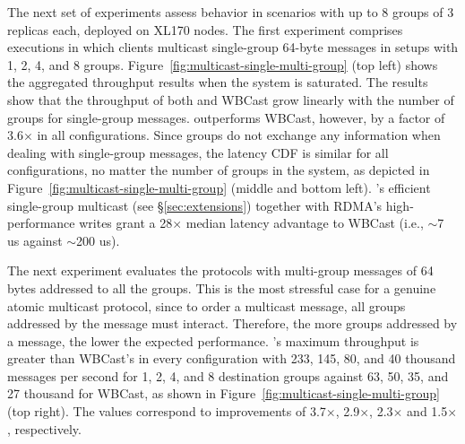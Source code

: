 The next set of experiments assess \libname behavior in scenarios with up to 8 groups of 3 replicas each, deployed on XL170 nodes.
The first experiment comprises executions in which clients multicast single-group 64-byte messages in setups with 1, 2, 4, and 8 groups.
Figure~\ref{fig:multicast-single-multi-group} (top left) shows the aggregated throughput results when the system is saturated. 
The results show that the throughput of both \libname and WBCast grow linearly with the number of groups for single-group messages. 
\libname outperforms WBCast, however, by a factor of 3.6$\times$ in all configurations.
Since groups do not exchange any information when dealing with single-group messages, the latency CDF is similar for all configurations, no matter the number of groups in the system, as depicted in Figure~\ref{fig:multicast-single-multi-group} (middle and bottom left).
\libname's efficient single-group multicast (see \S\ref{sec:extensions}) together with RDMA's high-performance writes grant \libname a 28$\times$ median latency advantage to WBCast (i.e., $\sim$7 us against $\sim$200 us).


The next experiment evaluates the protocols with multi-group messages of 64 bytes addressed to all the groups.
This is the most stressful case for a genuine atomic multicast protocol, since to order a multicast message, all groups addressed by the message must interact.
Therefore, the more groups addressed by a message, the lower the expected performance.
\libname's maximum throughput is greater than WBCast's in every configuration with 233, 145, 80, and 40 thousand messages per second for 1, 2, 4, and 8 destination groups against 63, 50, 35, and 27 thousand for WBCast, as shown in Figure~\ref{fig:multicast-single-multi-group} (top right).
The values correspond to improvements of 3.7$\times$, 2.9$\times$, 2.3$\times$ and 1.5$\times$, respectively.

